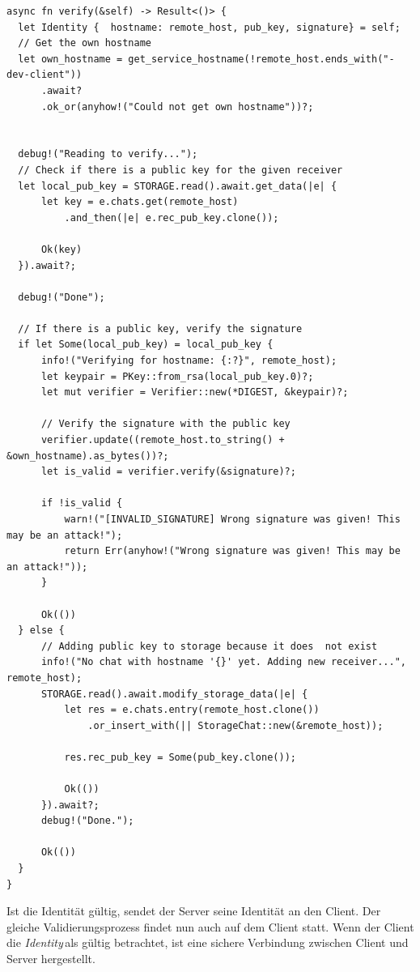 \documentclass[a4paper,ngerman, headheight=28pt,12pt]{scrartcl}
\newcommand{\identity}{\textit{Identity\,}}
\begin{document}
\begin{verbatim}
async fn verify(&self) -> Result<()> {
  let Identity {  hostname: remote_host, pub_key, signature} = self;
  // Get the own hostname
  let own_hostname = get_service_hostname(!remote_host.ends_with("-dev-client"))
      .await?
      .ok_or(anyhow!("Could not get own hostname"))?;


  debug!("Reading to verify...");
  // Check if there is a public key for the given receiver
  let local_pub_key = STORAGE.read().await.get_data(|e| {
      let key = e.chats.get(remote_host)
          .and_then(|e| e.rec_pub_key.clone());

      Ok(key)
  }).await?;

  debug!("Done");

  // If there is a public key, verify the signature
  if let Some(local_pub_key) = local_pub_key {
      info!("Verifying for hostname: {:?}", remote_host);
      let keypair = PKey::from_rsa(local_pub_key.0)?;
      let mut verifier = Verifier::new(*DIGEST, &keypair)?;

      // Verify the signature with the public key
      verifier.update((remote_host.to_string() + &own_hostname).as_bytes())?;
      let is_valid = verifier.verify(&signature)?;

      if !is_valid {
          warn!("[INVALID_SIGNATURE] Wrong signature was given! This may be an attack!");
          return Err(anyhow!("Wrong signature was given! This may be an attack!"));
      }

      Ok(())
  } else {
      // Adding public key to storage because it does  not exist
      info!("No chat with hostname '{}' yet. Adding new receiver...", remote_host);
      STORAGE.read().await.modify_storage_data(|e| {
          let res = e.chats.entry(remote_host.clone())
              .or_insert_with(|| StorageChat::new(&remote_host));

          res.rec_pub_key = Some(pub_key.clone());

          Ok(())
      }).await?;
      debug!("Done.");

      Ok(())
  }
}
\end{verbatim}
Ist die Identität gültig, sendet der Server seine Identität an den Client. Der gleiche Validierungsprozess findet nun auch auf dem Client statt. Wenn der Client die \identity als gültig betrachtet, ist eine sichere Verbindung zwischen Client und Server hergestellt.
\end{document}
